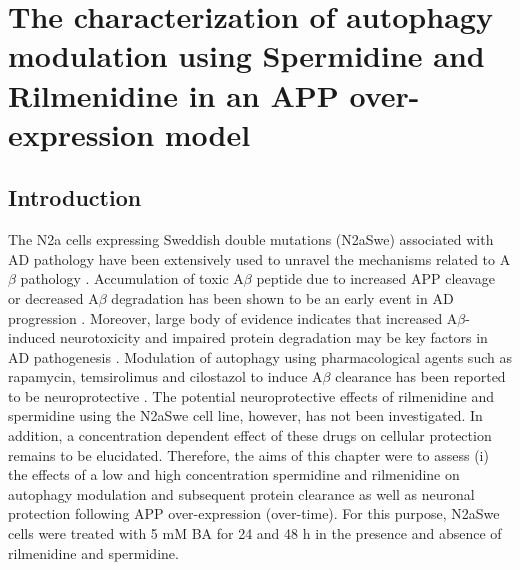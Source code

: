 \chapter{The characterization of autophagy modulation using Spermidine and Rilmenidine in an APP over-expression model }
\section{Introduction}

The N2a cells expressing Sweddish double mutations (N2aSwe) associated with AD pathology have been extensively used to unravel the mechanisms related to A$\beta$ pathology \citep{Lee2015,Park2011, Schlachetzki2013}. Accumulation of toxic A$\beta$ peptide due to increased APP cleavage or decreased A$\beta$ degradation has been shown to be an early event in AD progression \citep{Selkoe2016}. Moreover, large body of evidence indicates that increased A$\beta$-induced neurotoxicity and impaired protein degradation may be key factors in AD pathogenesis \citep{Selkoe2016} . Modulation of autophagy using pharmacological agents such as rapamycin, temsirolimus and cilostazol to induce A$\beta$ clearance has been reported to be neuroprotective \citep{Lee2015,Park2011,Jiang2014a}. The potential neuroprotective effects of rilmenidine and spermidine using the N2aSwe cell line, however, has not been investigated. In addition, a concentration dependent effect of these drugs on cellular protection remains to be elucidated. Therefore, the aims of this chapter were to assess (i) the effects of a low and high concentration spermidine and rilmenidine on autophagy modulation and subsequent protein clearance as well as neuronal protection following APP over-expression (over-time). For this purpose, N2aSwe cells were treated with 5 mM BA for 24 and 48 h in the presence and absence of rilmenidine and spermidine.

